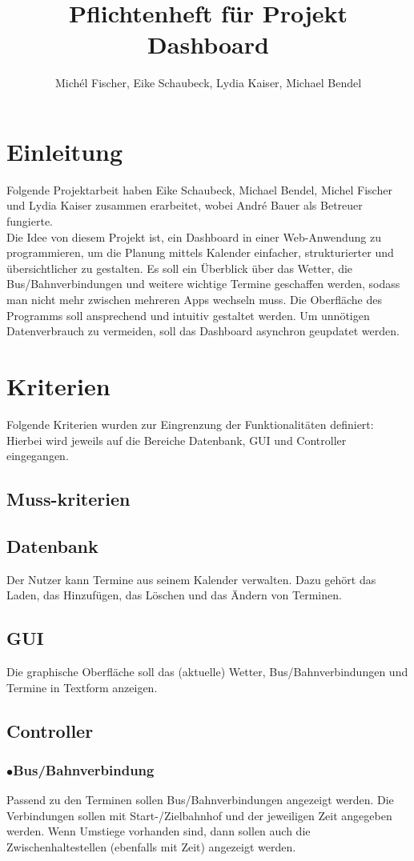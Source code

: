 \documentclass[12pt]{article}
\title{\Huge Pflichtenheft für Projekt Dashboard}
\author{Michél Fischer, Eike Schaubeck, Lydia Kaiser, Michael Bendel}
\begin{document}
\maketitle
\tableofcontents
\newpage
\section{Einleitung}
Folgende Projektarbeit haben Eike Schaubeck, Michael Bendel, Michel Fischer und Lydia Kaiser zusammen erarbeitet, wobei André Bauer als Betreuer fungierte.\\
Die Idee von diesem Projekt ist, ein Dashboard in einer Web-Anwendung zu programmieren, um die Planung mittels Kalender einfacher, strukturierter und übersichtlicher zu gestalten. Es soll ein Überblick über das Wetter, die Bus/Bahnverbindungen und weitere wichtige Termine geschaffen werden, sodass man nicht mehr zwischen mehreren Apps wechseln muss. Die Oberfläche des Programms soll ansprechend und intuitiv gestaltet werden. Um unnötigen Datenverbrauch zu vermeiden, soll das Dashboard asynchron geupdatet werden. 
\section{Kriterien}
Folgende Kriterien wurden zur Eingrenzung der Funktionalitäten definiert:\\
Hierbei wird jeweils auf die Bereiche Datenbank, GUI und Controller eingegangen.
\subsection{Muss-kriterien}
\subsection*{Datenbank}
Der Nutzer kann Termine aus seinem Kalender verwalten. Dazu gehört das Laden, das Hinzufügen, das Löschen und das Ändern von Terminen.
\subsection*{GUI}
Die graphische Oberfläche soll das (aktuelle) Wetter, Bus/Bahnverbindungen und Termine in Textform anzeigen.
\subsection*{Controller}
\subsubsection*{$\bullet$\quad Bus/Bahnverbindung}
Passend zu den Terminen sollen Bus/Bahnverbindungen angezeigt werden. Die Verbindungen sollen mit Start-/Zielbahnhof und der jeweiligen Zeit angegeben werden. Wenn Umstiege vorhanden sind, dann sollen auch die Zwischenhaltestellen (ebenfalls mit Zeit) angezeigt werden.
\end{document}
